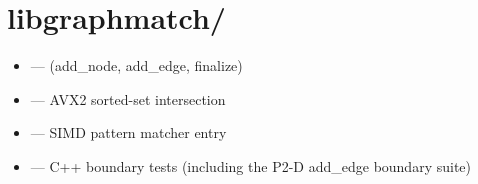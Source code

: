 \section{libgraphmatch/}

\begin{itemize}\setlength{\itemsep}{0pt}
    \item {} ---
         (add\_node, add\_edge, finalize)
    \item {} --- AVX2 sorted-set
        intersection
    \item {} --- SIMD pattern matcher entry
    \item {} --- C++ boundary
        tests (including the P2-D add\_edge boundary suite)
\end{itemize}
